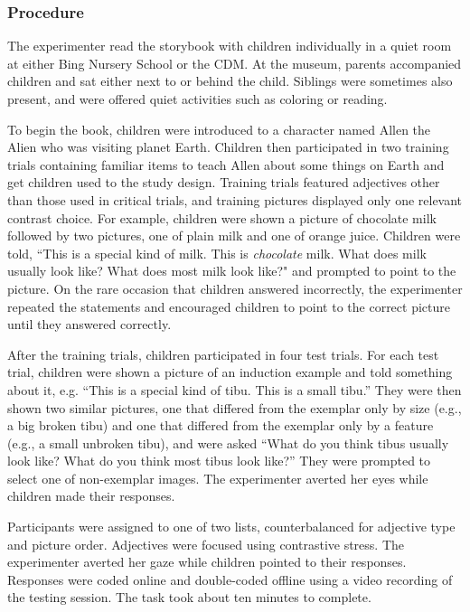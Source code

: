 \documentclass[man]{apa2}
\begin{document}
\subsubsection{Procedure}

The experimenter read the storybook with children individually in a quiet room at either Bing Nursery School or the CDM.  At the museum, parents accompanied children and sat either next to or behind the child.  Siblings were sometimes also present, and were offered quiet activities such as coloring or reading. 

To begin the book, children were introduced to a character named Allen the Alien who was visiting planet Earth.  Children then participated in two training trials containing familiar items to teach Allen about some things on Earth and get children used to the study design.  Training trials featured adjectives other than those used in critical trials, and training pictures displayed only one relevant contrast choice.  For example, children were shown a picture of chocolate milk followed by two pictures, one of plain milk and one of orange juice.  Children were told, ``This is a special kind of milk.  This is \emph{chocolate} milk.  What does milk usually look like?  What does most milk look like?" and prompted to point to the picture.  On the rare occasion that children answered incorrectly, the experimenter repeated the statements and encouraged children to point to the correct picture until they answered correctly.  

After the training trials, children participated in four test trials.  For each test trial, children were shown a picture of an induction example and told something about it, e.g. ``This is a special kind of tibu.  This is a small tibu.''  They were then shown two similar pictures, one that differed from the exemplar only by size (e.g., a big broken tibu) and one that differed from the exemplar only by a feature (e.g., a small unbroken tibu), and were asked ``What do you think tibus usually look like?  What do you think most tibus look like?'' They were prompted to select one of non-exemplar images. The experimenter averted her eyes while children made their responses. 

Participants were assigned to one of two lists, counterbalanced for adjective type and picture order.  Adjectives were focused using contrastive stress. The experimenter averted her gaze while children pointed to their responses.  Responses were coded online and double-coded offline using a video recording of the testing session.  The task took about ten minutes to complete. 
\end{document}
